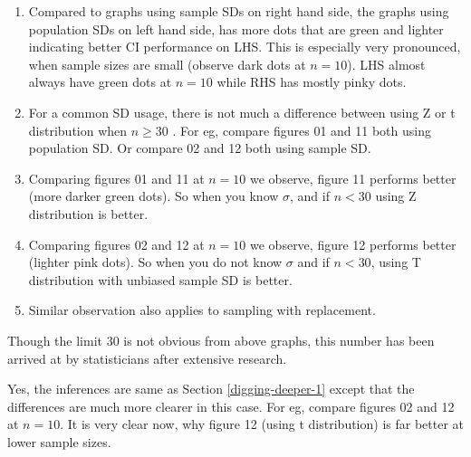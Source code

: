 \documentclass[float=false,crop=false]{standalone}
\begin{document}
\begin{enumerate}
\def\labelenumi{\arabic{enumi}.}
\tightlist
\item
  Compared to graphs using sample SDs on right hand side, the graphs
  using population SDs on left hand side, has more dots that are green
  and lighter indicating better CI performance on LHS. This is
  especially very pronounced, when sample sizes are small (observe dark
  dots at \(n=10\)). LHS almost always have green dots at \(n=10\) while
  RHS has mostly pinky dots.
\item
  For a common SD usage, there is not much a difference between using Z
  or t distribution when \(n \geq 30\) . For eg, compare figures 01 and
  11 both using population SD. Or compare 02 and 12 both using sample
  SD.
\item
  Comparing figures 01 and 11 at \(n=10\) we observe, figure 11 performs
  better (more darker green dots). So when you know \(\sigma\), and if
  \(n < 30\) using Z distribution is better.
\item
  Comparing figures 02 and 12 at \(n=10\) we observe, figure 12 performs
  better (lighter pink dots). So when you do not know \(\sigma\) and if
  \(n < 30\), using T distribution with unbiased sample SD is better.
\item
  Similar observation also applies to sampling with replacement.
\end{enumerate}

Though the limit 30 is not obvious from above graphs, this number has
been arrived at by statisticians after extensive research.

Yes, the inferences are same as Section \ref{digging-deeper-1} except
that the differences are much more clearer in this case. For eg, compare
figures 02 and 12 at \(n=10\). It is very clear now, why figure 12
(using t distribution) is far better at lower sample sizes.


    
    
    
    
\end{document}
